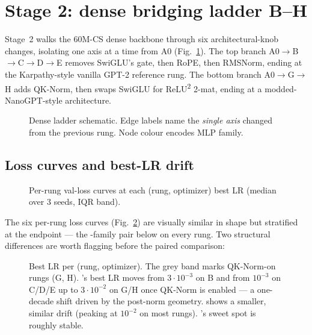 \section{Stage 2: dense bridging ladder B--H}\label{sec:stage2}

Stage~2 walks the 60M-CS dense backbone through six architectural-knob changes, isolating one axis at a time from A0 (Fig.~\ref{fig:ladder-schematic}). The top branch A0$\to$B$\to$C$\to$D$\to$E removes SwiGLU's gate, then RoPE, then RMSNorm, ending at the Karpathy-style vanilla GPT-2 reference rung. The bottom branch A0$\to$G$\to$H adds QK-Norm, then swaps SwiGLU for ReLU\textsuperscript{2} 2-mat, ending at a modded-NanoGPT-style architecture.

\begin{figure}[h]
\centering
{}
\caption{Dense ladder schematic. Edge labels name the \emph{single axis} changed from the previous rung. Node colour encodes MLP family.}\label{fig:ladder-schematic}
\end{figure}

\subsection{Loss curves and best-LR drift}

\begin{figure}[h]
\centering
{}
\caption{Per-rung val-loss curves at each (rung, optimizer) best LR (median over 3 seeds, IQR band).}\label{fig:stage2-curves}
\end{figure}

The six per-rung loss curves (Fig.~\ref{fig:stage2-curves}) are visually similar in shape but stratified at the endpoint --- the \optMuon-family pair below \optAdamW{} on every rung. Two structural differences are worth flagging before the paired comparison:

\begin{figure}[h]
\centering
{}
\caption{Best LR per (rung, optimizer). The grey band marks QK-Norm-on rungs (G, H). \optCoupled{}'s best LR moves from $3\!\cdot\!10^{-3}$ on B and from $10^{-3}$ on C/D/E up to $3\!\cdot\!10^{-2}$ on G/H once QK-Norm is enabled --- a one-decade shift driven by the post-norm geometry. \optMuon{} shows a smaller, similar drift (peaking at $10^{-2}$ on most rungs). \optAdamW{}'s sweet spot is roughly stable.}\label{fig:stage2-lr-drift}
\end{figure}

